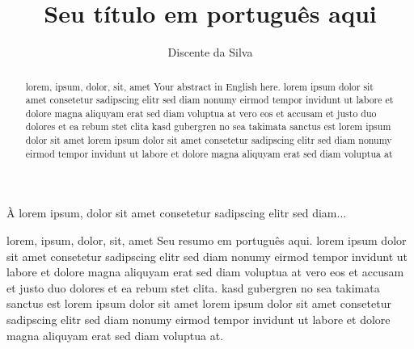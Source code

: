 \documentclass[portuguese,oneside]{pucrs-ppgcc}
\author{Discente da Silva}
\title{Seu título em português aqui}
      {Your title in english here}
\begin{document}



\begin{agradecimentos}
À lorem ipsum, dolor sit amet consetetur sadipscing elitr sed diam...
\end{agradecimentos}

\begin{resumo}{lorem, ipsum, dolor, sit, amet}
Seu resumo em português aqui. lorem ipsum dolor sit amet
consetetur sadipscing elitr sed diam nonumy eirmod tempor invidunt
ut labore et dolore magna aliquyam erat sed diam voluptua at vero
eos et accusam et justo duo dolores et ea rebum stet clita.  kasd
gubergren no sea takimata sanctus est lorem ipsum dolor sit amet
lorem ipsum dolor sit amet consetetur sadipscing elitr sed diam
nonumy eirmod tempor invidunt ut labore et dolore magna aliquyam
erat sed diam voluptua at.
\end{resumo}

\begin{abstract}{lorem, ipsum, dolor, sit, amet}
Your abstract in English here. lorem ipsum dolor sit amet
consetetur sadipscing elitr sed diam nonumy eirmod tempor invidunt
ut labore et dolore magna aliquyam erat sed diam voluptua at vero
eos et accusam et justo duo dolores et ea rebum stet clita kasd
gubergren no sea takimata sanctus est lorem ipsum dolor sit amet
lorem ipsum dolor sit amet consetetur sadipscing elitr sed diam
nonumy eirmod tempor invidunt ut labore et dolore magna aliquyam
erat sed diam voluptua at
\end{abstract}
\end{document}

